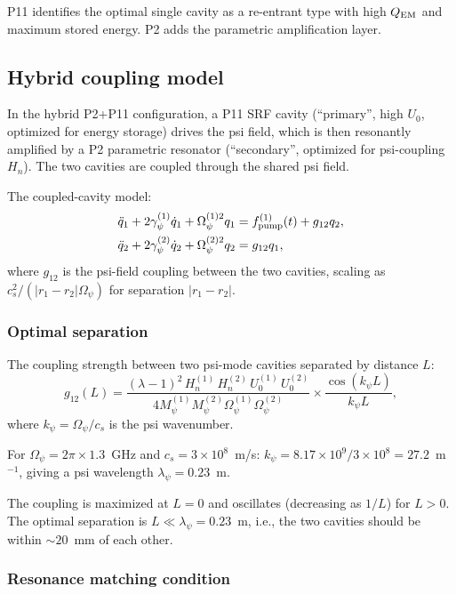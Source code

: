 \documentclass[11pt,twocolumn]{article}
\newcommand{\lam}{\lambda}
\newcommand{\Opsi}{\Omega_\psi}
\newcommand{\gpsi}{\gamma_\psi}
\newcommand{\Mpsi}{M_\psi}
\newcommand{\ee}[1]{\times 10^{#1}}
\theoremstyle{definition}
\theoremstyle{remark}
\begin{document}
P11 identifies the optimal single cavity as a re-entrant type with high
$Q_{\rm EM}$ and maximum stored energy.  P2 adds the parametric amplification
layer.

\subsection{Hybrid coupling model}
\label{sec:hybrid_coupling}

In the hybrid P2+P11 configuration, a P11 SRF cavity (``primary'',
high $U_0$, optimized for energy storage) drives the psi field, which is
then resonantly amplified by a P2 parametric resonator (``secondary'',
optimized for psi-coupling $H_n$).  The two cavities are coupled through
the shared psi field.

The coupled-cavity model:
\begin{align}
\ddot{q}_1 + 2\gpsi^{(1)}\dot{q}_1 + \Opsi^{(1)2}q_1
&= f_{\rm pump}^{(1)}(t) + g_{12}q_2,
\label{eq:CC1}\\
\ddot{q}_2 + 2\gpsi^{(2)}\dot{q}_2 + \Opsi^{(2)2}q_2
&= g_{12}q_1,
\label{eq:CC2}
\end{align}
where $g_{12}$ is the psi-field coupling between the two cavities,
scaling as $c_s^2/(|r_1 - r_2|\Opsi)$ for separation $|r_1 - r_2|$.

\subsubsection{Optimal separation}

The coupling strength between two psi-mode cavities separated by
distance $L$:
\begin{equation}
g_{12}(L) = \frac{(\lam-1)^2\,H_n^{(1)}\,H_n^{(2)}\,U_0^{(1)}\,U_0^{(2)}}
{4\Mpsi^{(1)}\Mpsi^{(2)}\Opsi^{(1)}\Opsi^{(2)}}\times
\frac{\cos(k_\psi L)}{k_\psi L},
\label{eq:g12}
\end{equation}
where $k_\psi = \Opsi/c_s$ is the psi wavenumber.

For $\Opsi = 2\pi\times1.3$~GHz and $c_s = 3\ee{8}$~m/s:
$k_\psi = 8.17\ee{9}/3\ee{8} = 27.2$~m$^{-1}$, giving a psi wavelength
$\lambda_\psi = 0.23$~m.

The coupling is maximized at $L = 0$ and oscillates (decreasing as $1/L$)
for $L > 0$.  The optimal separation is $L \ll \lambda_\psi = 0.23$~m,
i.e., the two cavities should be within $\sim 20$~mm of each other.

\subsubsection{Resonance matching condition}
\end{document}
